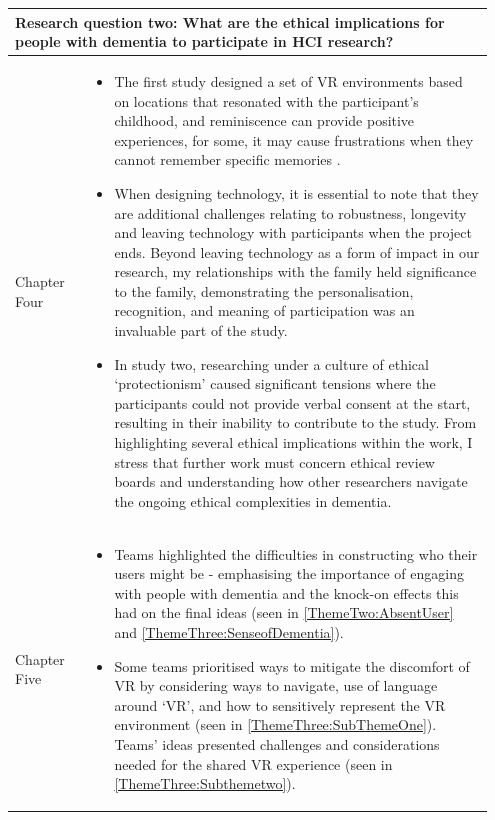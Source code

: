\pagebreak

\begin{table}[htp]
    \centering
    \begin{tabular}{p{0.15\linewidth} | p{0.8\linewidth}}
    \multicolumn{2}{p{0.95\linewidth}}{\textbf{Research question two: What are the ethical implications for people with dementia to participate in HCI research?}} 
    \\ \hline
     Chapter Four &
      \begin{itemize}
         \item The first study designed a set of VR environments based on locations that resonated with the participant's childhood, and reminiscence can provide positive experiences, for some, it may cause frustrations when they cannot remember specific memories \citep{lazar_critical_2017}.
         
        \item When designing technology, it is essential to note that they are additional challenges relating to robustness, longevity and leaving technology with participants when the project ends. Beyond leaving technology as a form of impact in our research, my relationships with the family held significance to the family, demonstrating the personalisation, recognition, and meaning of participation was an invaluable part of the study. 
        
        \item In study two, researching under a culture of ethical `protectionism' caused significant tensions where the participants could not provide verbal consent at the start, resulting in their inability to contribute to the study. From highlighting several ethical implications within the work, I stress that further work must concern ethical review boards and understanding how other researchers navigate the ongoing ethical complexities in dementia.

      \end{itemize}

       \\ \hline
        Chapter Five &
    \begin{itemize}
          \item Teams highlighted the difficulties in constructing who their users might be - emphasising the importance of engaging with people with dementia and the knock-on effects this had on the final ideas (seen in \ref{ThemeTwo:AbsentUser} and \ref{ThemeThree:SenseofDementia}).

          \item Some teams prioritised ways to mitigate the discomfort of VR by considering ways to navigate, use of language around `VR', and how to sensitively represent the VR environment (seen in \ref{ThemeThree:SubThemeOne}). Teams' ideas presented challenges and considerations needed for the shared VR experience (seen in \ref{ThemeThree:Subthemetwo}).


\end{itemize}
\end{tabular}
\end{table}
